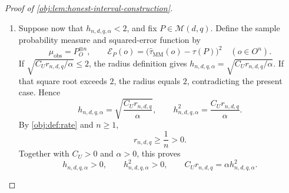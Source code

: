 \documentclass[11pt]{article}
\begin{document}
\begin{proof}[Proof of \cref{obj:lem:honest-interval-construction}]
\begin{enumerate}
For the remaining branch, define the Poisson weights and conditional stream averages by
\[
\omega_N=e^{-n/2}\frac{(n/2)^N}{N!}
\quad(N\in\mathbb N_0),
\]
\[
\overline\tau_N(o)
=
\frac{1}{4^N}
\sum_{\boldsymbol\zeta\in\{1,2,3,4\}^N}
\widetilde\tau(o;N,\boldsymbol\zeta)
\quad(0\le N\le n,\ o\in O^n),
\]
where \(\widetilde\tau(o;N,\boldsymbol\zeta)\) is the projected randomized estimate in \cref{obj:def:mm-estimator} with count \(N\) and stream assignment \(\boldsymbol\zeta\). There are \(4^N\) assignments, including one empty assignment when \(N=0\), and each estimate lies in \([-1,1]\). Therefore
\[
-4^N
\le
\sum_{\boldsymbol\zeta\in\{1,2,3,4\}^N}
\widetilde\tau(o;N,\boldsymbol\zeta)
\le4^N,
\qquad
-1\le\overline\tau_N(o)\le1.
\]
Moreover,
\[
\omega_N\ge0,\qquad
\sum_{N=0}^{\infty}\omega_N
=e^{-n/2}e^{n/2}=1,
\qquad
\sum_{N=0}^{n}\omega_N\le1.
\]
Since the randomized estimate equals zero when \(N>n\), this branch satisfies
\[
\widehat\tau_{\mathrm{MM}}(o)
=\sum_{N=0}^{n}\omega_N\overline\tau_N(o).
\]
Multiplying the stream-average bounds by the nonnegative weights and summing gives
\[
-1
\le-\sum_{N=0}^{n}\omega_N
\le\widehat\tau_{\mathrm{MM}}(o)
\le\sum_{N=0}^{n}\omega_N
\le1.
\]

In particular, if \(h_{n,d,q,\alpha}=2\), the target and estimator ranges imply
\[
\widehat\tau_{\mathrm{MM}}(o)-2\le-1\le\tau(P),
\qquad
\tau(P)\le1\le\widehat\tau_{\mathrm{MM}}(o)+2.
\]
Taking the maximum in the lower endpoint and the minimum in the upper endpoint yields
\[
L(o)\le\tau(P)\le U(o)
\qquad(P\in\mathcal M(d,q),\ o\in O^n).
\]

\item Suppose now that \(h_{n,d,q,\alpha}<2\), and fix \(P\in\mathcal M(d,q)\). Define the sample probability measure and squared-error function by
\[
\mu_{\mathrm{obs}}=P_O^{\otimes n},
\qquad
\mathcal E_P(o)
=\bigl(\widehat\tau_{\mathrm{MM}}(o)-\tau(P)\bigr)^2
\quad(o\in O^n).
\]
If \(\sqrt{C_Ur_{n,d,q}/\alpha}\le2\), the radius definition gives
\(h_{n,d,q,\alpha}=\sqrt{C_Ur_{n,d,q}/\alpha}\).
If that square root exceeds \(2\), the radius equals \(2\), contradicting the present case. Hence
\[
h_{n,d,q,\alpha}
=\sqrt{\frac{C_Ur_{n,d,q}}{\alpha}},
\qquad
h_{n,d,q,\alpha}^2=\frac{C_Ur_{n,d,q}}{\alpha}.
\]
By \cref{obj:def:rate} and \(n\ge1\),
\[
r_{n,d,q}\ge\frac1n>0.
\]
Together with \(C_U>0\) and \(\alpha>0\), this proves
\[
h_{n,d,q,\alpha}>0,
\qquad
h_{n,d,q,\alpha}^2>0,
\qquad
C_Ur_{n,d,q}=\alpha h_{n,d,q,\alpha}^2.
\]


\end{enumerate}
\end{proof}
\end{document}
